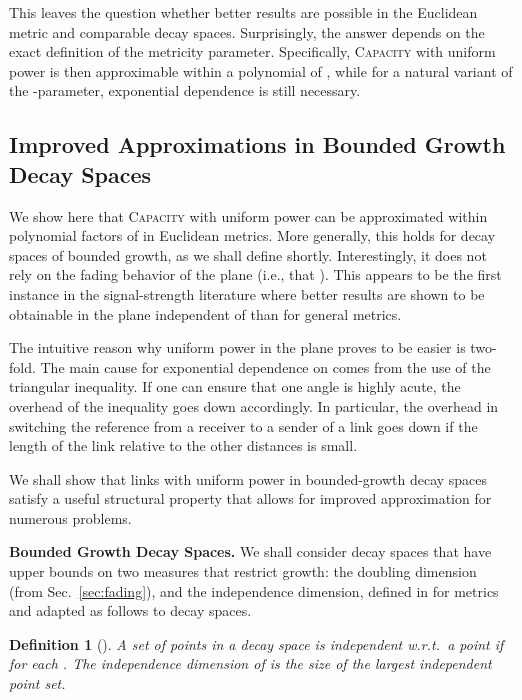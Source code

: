 \documentclass[11pt]{amsart}
\newtheorem{definition}{Definition}[section]
\newcommand{\prob}[1]{\textsc{#1}}
\newcommand{\Capacity}{\prob{Capacity}}
\newcommand{\capacity}{\Capacity}
\newcommand{\mypara}[1]{\smallskip\noindent\textbf{#1.}}  \newcommand{\tightpara}[1]{\noindent\textbf{#1.}}  \newcommand{\inddim}{D}
\begin{document}
This leaves the question whether better results are possible in the
Euclidean metric and comparable decay spaces. 
Surprisingly, the answer depends on the exact definition of the
metricity parameter.
Specifically, {\capacity} with uniform power is then
approximable within a polynomial of , while for
a natural variant of the -parameter, exponential dependence
is still necessary.

\subsection{Improved Approximations in Bounded Growth Decay Spaces}
\label{sec:polya}

We show here that {\capacity} with uniform power can be approximated
within polynomial factors of  in Euclidean metrics.  More
generally, this holds for decay spaces of bounded growth, as we shall
define shortly.  Interestingly, it does not rely on the fading
behavior of the plane (i.e., that ). This appears to be
the first instance in the signal-strength literature where better
results are shown to be obtainable in the plane independent of
 than for general metrics.

The intuitive reason why uniform power in the plane proves to be easier
is two-fold.  The main cause for exponential dependence on 
comes from the use of the triangular inequality. If one can ensure
that one angle is highly acute, the overhead of the inequality goes
down accordingly. In particular, the overhead in switching the
reference from a receiver to a sender of a link goes down if the
length of the link relative to the other distances is small.

We shall show that links with uniform power in bounded-growth decay spaces
satisfy a useful structural property that allows for improved
approximation for numerous problems.

\mypara{Bounded Growth Decay Spaces}
We shall consider decay spaces that have upper bounds on two measures
that restrict growth: 
the doubling dimension (from Sec.~\ref{sec:fading}), 
and the independence dimension, defined in \cite{GHWW09} for metrics
and adapted as follows to decay spaces.


\begin{definition}[\cite{GHWW09}]
A set  of points in a decay space  is \emph{independent} w.r.t.\ a point  if  for each .
The \emph{independence dimension} of  is the size of the largest independent point set.
\end{definition}
\end{document}
